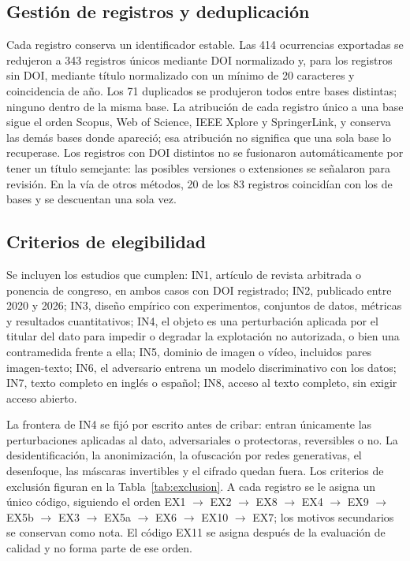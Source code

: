 \documentclass[pdflatex,sn-mathphys-num]{sn-jnl}
\theoremstyle{thmstyleone}
\theoremstyle{thmstyletwo}
\theoremstyle{thmstylethree}
\begin{document}
\subsection{Gestión de registros y deduplicación}

Cada registro conserva un identificador estable. Las 414 ocurrencias exportadas se redujeron a 343 registros únicos mediante DOI normalizado y, para los registros sin DOI, mediante título normalizado con un mínimo de 20 caracteres y coincidencia de año. Los 71 duplicados se produjeron todos entre bases distintas; ninguno dentro de la misma base. La atribución de cada registro único a una base sigue el orden Scopus, Web of Science, IEEE Xplore y SpringerLink, y conserva las demás bases donde apareció; esa atribución no significa que una sola base lo recuperase. Los registros con DOI distintos no se fusionaron automáticamente por tener un título semejante: las posibles versiones o extensiones se señalaron para revisión. En la vía de otros métodos, 20 de los 83 registros coincidían con los de bases y se descuentan una sola vez.

\subsection{Criterios de elegibilidad}\label{sec:elegibilidad}

Se incluyen los estudios que cumplen: IN1, artículo de revista arbitrada o ponencia de congreso, en ambos casos con DOI registrado; IN2, publicado entre 2020 y 2026; IN3, diseño empírico con experimentos, conjuntos de datos, métricas y resultados cuantitativos; IN4, el objeto es una perturbación aplicada por el titular del dato para impedir o degradar la explotación no autorizada, o bien una contramedida frente a ella; IN5, dominio de imagen o vídeo, incluidos pares imagen-texto; IN6, el adversario entrena un modelo discriminativo con los datos; IN7, texto completo en inglés o español; IN8, acceso al texto completo, sin exigir acceso abierto.

La frontera de IN4 se fijó por escrito antes de cribar: entran únicamente las perturbaciones aplicadas al dato, adversariales o protectoras, reversibles o no. La desidentificación, la anonimización, la ofuscación por redes generativas, el desenfoque, las máscaras invertibles y el cifrado quedan fuera. Los criterios de exclusión figuran en la Tabla~\ref{tab:exclusion}. A cada registro se le asigna un único código, siguiendo el orden EX1 $\rightarrow$ EX2 $\rightarrow$ EX8 $\rightarrow$ EX4 $\rightarrow$ EX9 $\rightarrow$ EX5b $\rightarrow$ EX3 $\rightarrow$ EX5a $\rightarrow$ EX6 $\rightarrow$ EX10 $\rightarrow$ EX7; los motivos secundarios se conservan como nota. El código EX11 se asigna después de la evaluación de calidad y no forma parte de ese orden.
\end{document}
